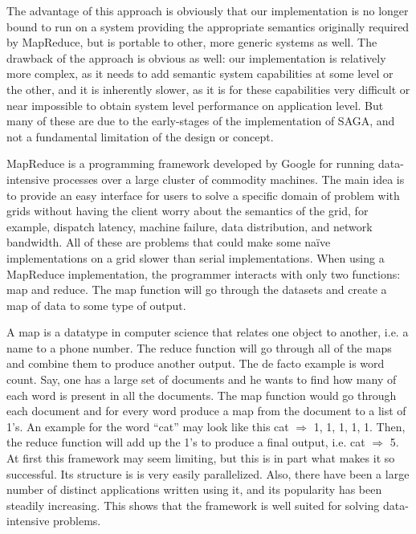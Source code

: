\documentclass[conference,final]{IEEEtran}
\begin{document}
The advantage of this approach is obviously that our implementation is
no longer bound to run on a system providing the appropriate semantics
originally required by MapReduce, but is portable to other, more
generic systems as well.  The drawback of the approach is obvious as
well: our implementation is relatively more complex, as it needs to
add semantic system capabilities at some level or the other, and it is
inherently slower, as it is for these capabilities very difficult or
near impossible to obtain system level performance on application
level.  But many of these are due to the early-stages of the
implementation of SAGA, and not a fundamental limitation of the design
or concept.


MapReduce is a programming framework developed by Google for running
data-intensive processes over a large cluster of commodity machines.
The main idea is to provide an easy interface for users to solve a
specific domain of problem with grids without having the client worry 
about the semantics of the grid, for example, dispatch latency, machine
failure, data distribution, and network bandwidth.  All of these are
problems that could make some naïve implementations on a grid slower
than serial implementations.  When using a MapReduce implementation,
the programmer interacts with only two functions: map and reduce.  
The map function will go through the datasets and create a map of data
to some type of output.  

A map is a datatype in computer science that relates one object to
another, i.e. a name to a phone number.  The reduce function will go
through all of the maps and combine them to produce another output.
The de facto example is word count.  Say, one has a large set of
documents and he wants to find how many of each word is present in all
the documents.  The map function would go through each document and
for every word produce a map from the document to a list of 1’s.  An
example for the word “cat” may look like this cat $\Rightarrow$ 1, 1,
1, 1, 1.  Then, the reduce function will add up the 1’s to produce a
final output, i.e. cat $\Rightarrow$ 5.  At first this framework may
seem limiting, but this is in part what makes it so successful.  Its
structure is is very easily parallelized.  Also, there have been a
large number of distinct applications written using it, and its
popularity has been steadily increasing.  This shows that the
framework is well suited for solving data-intensive problems.
\end{document}
